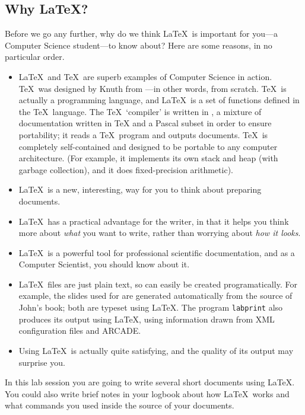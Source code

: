 \begin{refsection}
\section{Why \LaTeX?}
\label{sec:why}
 Before we go any further, why do we think \LaTeX\ is important for you---a Computer Science student---to know about? Here are some reasons, in no particular order.

\begin{itemize}
\item \LaTeX\ and \TeX\ are superb examples of Computer Science in action. \TeX\ was designed by Knuth from ---in other words, from scratch.  \TeX\ is actually a programming language, and \LaTeX\ is a set of functions defined in the \TeX\ language. The \TeX\ `compiler'  is  written in , a mixture of documentation written in TeX and a Pascal subset in order to ensure portability; it reads a \TeX\ program and outputs documents. \TeX\ is completely self-contained and designed to be portable to any computer architecture. (For example, it implements its own stack and heap (with garbage collection), and it does fixed-precision arithmetic). 
\item \LaTeX\ is a new, interesting, way for you to think about preparing documents. 
\item \LaTeX\ has a practical advantage for the writer, in that it helps you think more about \emph{what} you want to write, rather than worrying about \emph{how it looks}.
\item \LaTeX\ is a powerful tool for professional scientific documentation, and as a Computer Scientist, you should know about it.
\item \LaTeX\ files are just plain text, so can easily be created programatically. For example,  the slides used for  are generated automatically from the source of John's book; both are typeset using \LaTeX. The program \texttt{labprint} also produces its output using \LaTeX, using information drawn from XML configuration files and ARCADE.
  
\item Using \LaTeX\ is actually quite satisfying, and the quality of its output may surprise you.
\end{itemize}

In this lab session you are going to write several short  documents using \LaTeX. You could also write brief notes in your logbook about how \LaTeX\ works and what commands you used inside the source of your documents.


\end{refsection}
